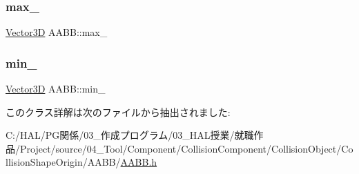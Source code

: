 \subsubsection{\texorpdfstring{max\+\_\+}{max\_}}
{\footnotesize\ttfamily \mbox{\hyperlink{class_vector3_d}{Vector3D}} A\+A\+B\+B\+::max\+\_\+}

\mbox{\label{class_a_a_b_b_a682f7bc02fc950a24ce8a8e512e4eb52}} 
\subsubsection{\texorpdfstring{min\+\_\+}{min\_}}
{\footnotesize\ttfamily \mbox{\hyperlink{class_vector3_d}{Vector3D}} A\+A\+B\+B\+::min\+\_\+}



このクラス詳解は次のファイルから抽出されました\+:\begin{DoxyCompactItemize}
\item 
C\+:/\+H\+A\+L/\+P\+G関係/03\+\_\+作成プログラム/03\+\_\+\+H\+A\+L授業/就職作品/\+Project/source/04\+\_\+\+Tool/\+Component/\+Collision\+Component/\+Collision\+Object/\+Collision\+Shape\+Origin/\+A\+A\+B\+B/\mbox{\hyperlink{_a_a_b_b_8h}{A\+A\+B\+B.\+h}}\end{DoxyCompactItemize}
